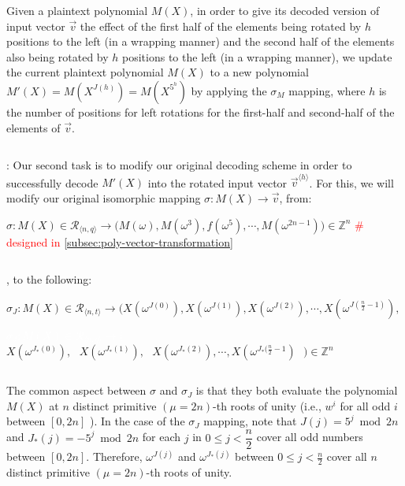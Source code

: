 Given a plaintext polynomial $M(X)$, in order to give its decoded version of input vector $\vec{v}$ the effect of the first half of the elements being rotated by $h$ positions to the left (in a wrapping manner) and the second half of the elements also being rotated by $h$ positions to the left (in a wrapping manner), we update the current plaintext polynomial $M(X)$ to a new polynomial $M'(X) = M(X^{J(h)}) = M(X^{5^h})$ by applying the $\sigma_M$ mapping, where $h$ is the number of positions for left rotations for the first-half and second-half of the elements of $\vec{v}$. 


$ $

: Our second task is to modify our original decoding scheme in order to successfully decode $M'(X)$ into the rotated input vector $\vec{v}^{\langle h \rangle}$. For this, we will modify our original isomorphic mapping $\sigma : M(X) \longrightarrow \vec{v}$, from:

$\sigma: M(X) \in \mathcal{R}_{\langle n, q \rangle} \longrightarrow  \bm{(}M(\omega), M(\omega^3),f(\omega^5), \cdots, M(\omega^{2n-1})\bm{)} \in \mathbb{Z}^n$ \textcolor{red}{ \text{ } \# designed in \autoref{subsec:poly-vector-transformation}}

$ $

, to the following: 

$\sigma_J: M(X) \in \mathcal{R}_{\langle n, t \rangle} \longrightarrow  \bm{(}X(\omega^{J(0)}),X(\omega^{J(1)}),X(\omega^{J(2)}), \cdots, X(\omega^{J(\frac{n}{2} - 1)}), $

\textcolor{white}{$\sigma_J: M(X) \in \mathcal{R}_{\langle n, q \rangle} \longrightarrow  \bm{(}$} $X(\omega^{J_*(0)}), \text{ } X(\omega^{J_*(1)}), \text{ } X(\omega^{J_*(2)}), \cdots, X(\omega^{J_*(\frac{n}{2} - 1}) \text{ } \bm{)} \in \mathbb{Z}^{n}$



$ $

The common aspect between $\sigma$ and $\sigma_J$ is that they both evaluate the polynomial $M(X)$ at $n$ distinct primitive $(\mu=2n)$-th roots of unity (i.e., $w^i$ for all odd $i$ between $[0,2n]$ ). In the case of the $\sigma_J$ mapping, note that $J(j) = 5^j \bmod 2n$ \text{ } and \text{ } $J_*(j) = -5^j \bmod 2n$ \text{ } for each $j$ in $0 \leq j < \dfrac{n}{2} $ \text{ }  cover all odd numbers between $[0, 2n]$. Therefore, $\omega^{J(j)}$ and $\omega^{J_*(j)}$ between $0 \leq j < \frac{n}{2}$ cover all $n$ distinct primitive $(\mu=2n)$-th roots of unity.

